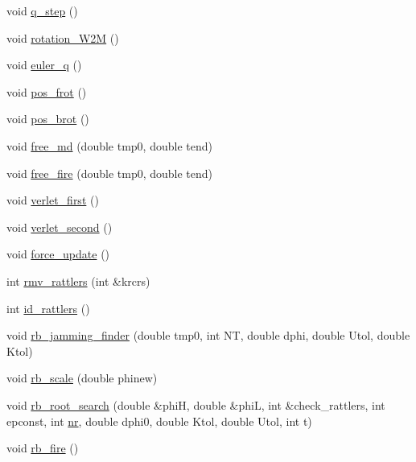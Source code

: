 \begin{DoxyCompactItemize}
\item 
void \mbox{\hyperlink{classrigidbody_a4367ebfbba9658e93277b388c346ef6d}{q\+\_\+step}} ()
\item 
void \mbox{\hyperlink{classrigidbody_ab0dbd8ea400ec317677675c6298d1243}{rotation\+\_\+\+W2M}} ()
\item 
void \mbox{\hyperlink{classrigidbody_a0329c2b25c20317b7e869e35adc27b0a}{euler\+\_\+q}} ()
\item 
void \mbox{\hyperlink{classrigidbody_a839b5b063891c8fc71ad3dd990cfbf4a}{pos\+\_\+frot}} ()
\item 
void \mbox{\hyperlink{classrigidbody_aff843c0c9e358e2d33b0c7ff02c37573}{pos\+\_\+brot}} ()
\item 
void \mbox{\hyperlink{classrigidbody_a0855a20a0df2aa086f24f2a383cf8189}{free\+\_\+md}} (double tmp0, double tend)
\item 
void \mbox{\hyperlink{classrigidbody_adcb984a4d69585e1c617d9506218ac9c}{free\+\_\+fire}} (double tmp0, double tend)
\item 
void \mbox{\hyperlink{classrigidbody_afabb8a8ca32317fc8fdb534932e0de88}{verlet\+\_\+first}} ()
\item 
void \mbox{\hyperlink{classrigidbody_a284a5d8bbc75fe6fd81217c6f861ae60}{verlet\+\_\+second}} ()
\item 
void \mbox{\hyperlink{classrigidbody_a6fd9a15863ae304469f28e4ef7274058}{force\+\_\+update}} ()
\item 
int \mbox{\hyperlink{classrigidbody_a8bb19f9f20480add2468b3b9376f7e7a}{rmv\+\_\+rattlers}} (int \&krcrs)
\item 
int \mbox{\hyperlink{classrigidbody_a69d75bd6de90bb5b9a446b8aa23741de}{id\+\_\+rattlers}} ()
\item 
void \mbox{\hyperlink{classrigidbody_ab2d23acd630aa36261f68b7c01ce3dd4}{rb\+\_\+jamming\+\_\+finder}} (double tmp0, int NT, double dphi, double Utol, double Ktol)
\item 
void \mbox{\hyperlink{classrigidbody_aede3f62a6b910a9bc10641de08a1f329}{rb\+\_\+scale}} (double phinew)
\item 
void \mbox{\hyperlink{classrigidbody_ace2c7ef24606c9912fd004a293569b6c}{rb\+\_\+root\+\_\+search}} (double \&phiH, double \&phiL, int \&check\+\_\+rattlers, int epconst, int \mbox{\hyperlink{classpacking_a31eede3d604c45fef6021170ee506c77}{nr}}, double dphi0, double Ktol, double Utol, int t)
\item 
void \mbox{\hyperlink{classrigidbody_a11a83ecf91f922faff8e2f26c8eace54}{rb\+\_\+fire}} ()
\item 

\end{DoxyCompactItemize}
